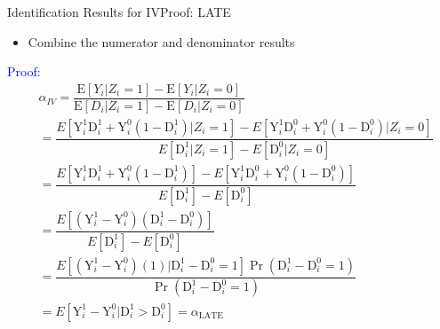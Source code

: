 \documentclass[dvipsnames,hyperref={pdfpagelabels=false}]{beamer}
\begin{document}
\begin{frame}{Identification Results for IV}{Proof: LATE}
	\begin{itemize}
		\item Combine the numerator and denominator results
	\end{itemize}			
	\vspace{0.2cm}
	\textcolor{blue}{Proof:}
	\begin{equation*}
	\begin{aligned}
	&\alpha_{IV}=\dfrac{\mathrm{E}[Y_{i}|Z_{i}=1]-\mathrm{E}[Y_{i}|Z_{i}=0]}{\mathrm{E}[D_{i}|Z_{i}=1]-\mathrm{E}[D_{i}|Z_{i}=0]}  \\
	&= \dfrac{E[\mathrm{Y}^{1}_{i} \mathrm{D}^{1}_{i}+\mathrm{Y}^{0}_{i}(1-\mathrm{D}^{1}_{i})|Z_{i}=1]-E[\mathrm{Y}^{1}_{i} \mathrm{D}^{0}_{i}+\mathrm{Y}^{0}_{i} (1-\mathrm{D}^{0}_{i})|Z_{i}=0]}{E[\mathrm{D}^{1}_{i}|Z_{i}=1]-E[\mathrm{D}^{0}_{i}|Z_{i}=0]}  \\
	&= \dfrac{E[\mathrm{Y}^{1}_{i} \mathrm{D}^{1}_{i}+\mathrm{Y}^{0}_{i}(1-\mathrm{D}^{1}_{i})]-E[\mathrm{Y}^{1}_{i} \mathrm{D}^{0}_{i}+\mathrm{Y}^{0}_{i}(1-\mathrm{D}^{0}_{i})]}{E[\mathrm{D}^{1}_{i}]-E[\mathrm{D}^{0}_{i}]}\\
	&= \dfrac{E[(\mathrm{Y}^{1}_{i}-\mathrm{Y}^{0}_{i})(\mathrm{D}^{1}_{i}-\mathrm{D}^{0}_{i})]}{E[\mathrm{D}^{1}_{i}]-E[\mathrm{D}^{0}_{i}]}\\
	&= \dfrac{E[(\mathrm{Y}^{1}_{i}-\mathrm{Y}^{0}_{i}) (1)|\mathrm{D}^{1}_{i}-\mathrm{D}^{0}_{i}=1] \Pr(\mathrm{D}^{1}_{i}-\mathrm{D}^{0}_{i}=1)}{\Pr(\mathrm{D}^{1}_{i}-\mathrm{D}^{0}_{i}=1)}\\
	&= E[\mathrm{Y}^{1}_{i}-\mathrm{Y}^{0}_{i}|\mathrm{D}^{1}_{i}>\mathrm{D}^{0}_{i}] = \alpha_{\text{LATE}}
	\end{aligned}
	\end{equation*}
	
\end{frame}
\end{document}
